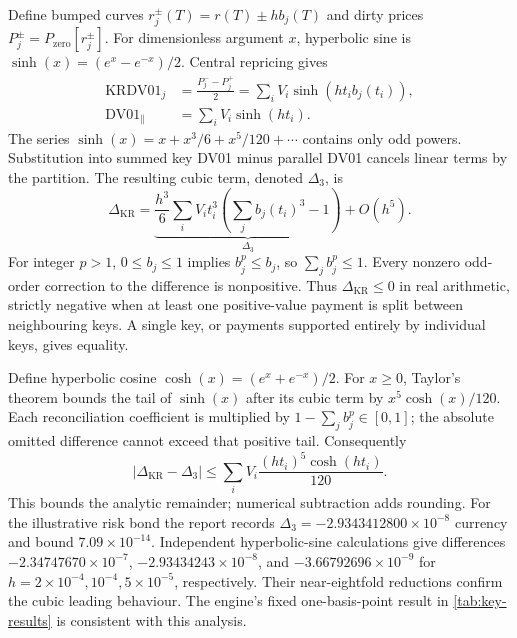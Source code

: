 Define bumped curves \(r_j^\pm(T)=r(T)\pm hb_j(T)\) and dirty prices \(P_j^\pm=P_{\mathrm{zero}}[r_j^\pm]\). For dimensionless argument \(x\), hyperbolic sine is \(\sinh(x)=(e^x-e^{-x})/2\). Central repricing gives
\begin{align}
\mathrm{KRDV01}_j&=\frac{P_j^--P_j^+}{2}
=\sum_iV_i\sinh(ht_ib_j(t_i)),\label{eq:app-key-sinh}\\
\mathrm{DV01}_{\parallel}&=\sum_iV_i\sinh(ht_i).\label{eq:app-parallel-sinh}
\end{align}
The series \(\sinh(x)=x+x^3/6+x^5/120+\cdots\) contains only odd powers. Substitution into summed key DV01 minus parallel DV01 cancels linear terms by the partition. The resulting cubic term, denoted \(\Delta_3\), is
\begin{equation}\label{eq:reconciliation}
\Delta_{\mathrm{KR}}=
\underbrace{\frac{h^3}{6}\sum_iV_it_i^3
 \left(\sum_jb_j(t_i)^3-1\right)}_{\Delta_3}
+O(h^5).
\end{equation}
For integer \(p>1\), \(0\leq b_j\leq1\) implies \(b_j^p\leq b_j\), so \(\sum_jb_j^p\leq1\). Every nonzero odd-order correction to the difference is nonpositive. Thus \(\Delta_{\mathrm{KR}}\leq0\) in real arithmetic, strictly negative when at least one positive-value payment is split between neighbouring keys. A single key, or payments supported entirely by individual keys, gives equality.

Define hyperbolic cosine \(\cosh(x)=(e^x+e^{-x})/2\). For \(x\geq0\), Taylor's theorem bounds the tail of \(\sinh(x)\) after its cubic term by \(x^5\cosh(x)/120\). Each reconciliation coefficient is multiplied by \(1-\sum_j b_j^p\in[0,1]\); the absolute omitted difference cannot exceed that positive tail. Consequently
\begin{equation}\label{eq:app-remainder}
|\Delta_{\mathrm{KR}}-\Delta_3|
\leq\sum_iV_i\frac{(ht_i)^5\cosh(ht_i)}{120}.
\end{equation}
This bounds the analytic remainder; numerical subtraction adds rounding. For the illustrative risk bond the report records \(\Delta_3=-2.9343412800\times10^{-8}\) currency and bound \(7.09\times10^{-14}\). Independent hyperbolic-sine calculations give differences
\(-2.34747670\times10^{-7}\), \(-2.93434243\times10^{-8}\), and
\(-3.66792696\times10^{-9}\) for \(h=2\times10^{-4},10^{-4},5\times10^{-5}\), respectively. Their near-eightfold reductions confirm the cubic leading behaviour. The engine's fixed one-basis-point result in \cref{tab:key-results} is consistent with this analysis.


